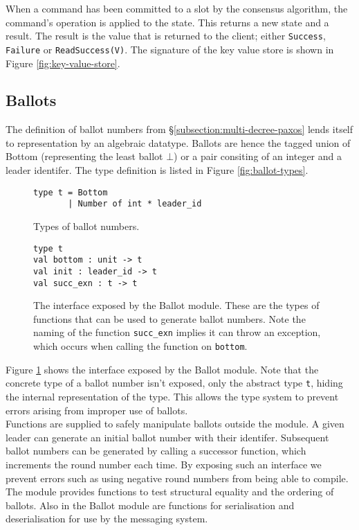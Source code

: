 When a command has been committed to a slot by the consensus algorithm, the command's operation is applied to the state. This returns a new state and a result. The result is the value that is returned to the client; either \texttt{Success}, \texttt{Failure} or \texttt{ReadSuccess(V)}. The signature of the key value store is shown in Figure \ref{fig:key-value-store}.

\subsection{Ballots}

The definition of ballot numbers from \S\ref{subsection:multi-decree-paxos} lends itself to representation by an algebraic datatype. Ballots are hence the tagged union of Bottom (representing the least ballot $\bot$) or a pair consiting of an integer and a leader identifer. The type definition is listed in Figure \ref{fig:ballot-types}. \\

\begin{figure}
  \begin{lstlisting}
type t = Bottom
       | Number of int * leader_id
  \end{lstlisting}
    \caption{Types of ballot numbers.}
    \label{fig:ballot-types}
    
      \begin{lstlisting}
type t
val bottom : unit -> t
val init : leader_id -> t
val succ_exn : t -> t
  \end{lstlisting}
    \caption{The interface exposed by the Ballot module. These are the types of functions that can be used to generate ballot numbers. Note the naming of the function \texttt{succ\_exn} implies it can throw an exception, which occurs when calling the function on \texttt{bottom}.}
    \label{fig:ballot-interface}
  \centering
\end{figure}

Figure \ref{fig:ballot-interface} shows the interface exposed by the Ballot module. Note that the concrete type of a ballot number isn't exposed, only the abstract type \texttt{t}, hiding the internal representation of the type. This allows the type system to prevent errors arising from improper use of ballots. \\

Functions are supplied to safely manipulate ballots outside the module. A given leader can generate an initial ballot number with their identifer. Subsequent ballot numbers can be generated by calling a successor function, which increments the round number each time. By exposing such an interface we prevent errors such as using negative round numbers from being able to compile. The module provides functions to test structural equality and the ordering of ballots. Also in the Ballot module are functions for serialisation and deserialisation for use by the messaging system.

